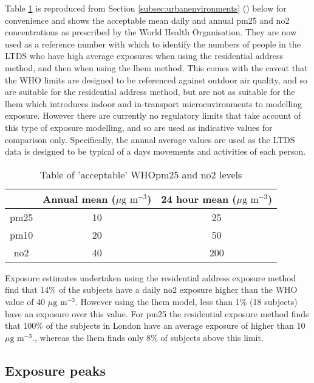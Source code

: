 Table \ref{tab:whopmandno2levels} is reproduced from Section \ref{subsec:urbanenvironments} () below for convenience and shows the acceptable mean daily and annual \gls{pm25} and \gls{no2} concentrations as prescribed by the World Health Organisation. They are now used as a reference number with which to identify the numbers of people in the LTDS who have high average exposures when using the residential address method, and then when using the \gls{lhem} method. This comes with the caveat that the WHO limits are designed to be referenced against outdoor air quality, and so are suitable for the residential address method, but are not as suitable for the \gls{lhem} which introduces indoor and in-transport microenvironments to modelling exposure. However there are currently no regulatory limits that take account of this type of exposure modelling, and so are used as indicative values for comparison only. Specifically, the annual average values are used as the LTDS data is designed to be typical of a days movements and activities of each person.

\begin{table}[H]
\caption{Table of 'acceptable' WHO\gls{pm25} and \gls{no2} levels}
\centering
    \begin{tabular}{ | c | c | c |}
    \hline 
     & Annual mean ($\mu \text{g m}^{-3}$) & 24 hour mean ($\mu \text{g m}^{-3}$) \\ \hline
     \gls{pm25} & 10 & 25\\ \hline
     \gls{pm10} & 20 & 50\\ \hline
     \gls{no2} & 40 & 200\\ \hline
    \end{tabular}
\label{tab:whopmandno2levels}
\end{table}

Exposure estimates undertaken using the residential address exposure method find that 14\% of the subjects have a daily \gls{no2} exposure higher than the WHO value of 40 $\mu \text{g m}^{-3}$. However using the \gls{lhem} model, less than 1\% (18 subjects) have an  exposure over this value. For \gls{pm25} the residential exposure method finds that 100\% of the subjects in London have an average exposure of higher than 10 $\mu \text{g m}^{-3}$., whereas the \gls{lhem} finds only 8\% of subjects above this limit.

\subsection{Exposure peaks}
\label{subsec:exposure_peaks_by_age_group}

